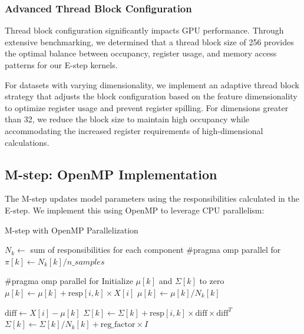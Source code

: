 \documentclass[conference]{IEEEtran}
\begin{document}
\subsubsection{Advanced Thread Block Configuration}

Thread block configuration significantly impacts GPU performance. Through extensive benchmarking, we determined that a thread block size of 256 provides the optimal balance between occupancy, register usage, and memory access patterns for our E-step kernels.

For datasets with varying dimensionality, we implement an adaptive thread block strategy that adjusts the block configuration based on the feature dimensionality to optimize register usage and prevent register spilling. For dimensions greater than 32, we reduce the block size to maintain high occupancy while accommodating the increased register requirements of high-dimensional calculations.

\subsection{M-step: OpenMP Implementation}

The M-step updates model parameters using the responsibilities calculated in the E-step. We implement this using OpenMP to leverage CPU parallelism:

\begin{algorithm}
\caption{M-step with OpenMP Parallelization}
\begin{algorithmic}[1]
\STATE $N_k \gets$ sum of responsibilities for each component
\STATE \#pragma omp parallel for
    \STATE $\pi[k] \gets N_k[k] / n\_samples$
\ENDFOR

\STATE \#pragma omp parallel for
        \STATE Initialize $\mu[k]$ and $\Sigma[k]$ to zero
            \STATE $\mu[k] \gets \mu[k] + \text{resp}[i,k] \times X[i]$
        \ENDFOR
        \STATE $\mu[k] \gets \mu[k] / N_k[k]$
        
            \STATE $\text{diff} \gets X[i] - \mu[k]$
            \STATE $\Sigma[k] \gets \Sigma[k] + \text{resp}[i,k] \times \text{diff} \times \text{diff}^T$
        \ENDFOR
        \STATE $\Sigma[k] \gets \Sigma[k] / N_k[k] + \text{reg\_factor} \times I$
    \ENDIF
\ENDFOR
\end{algorithmic}
\end{algorithm}
\end{document}
